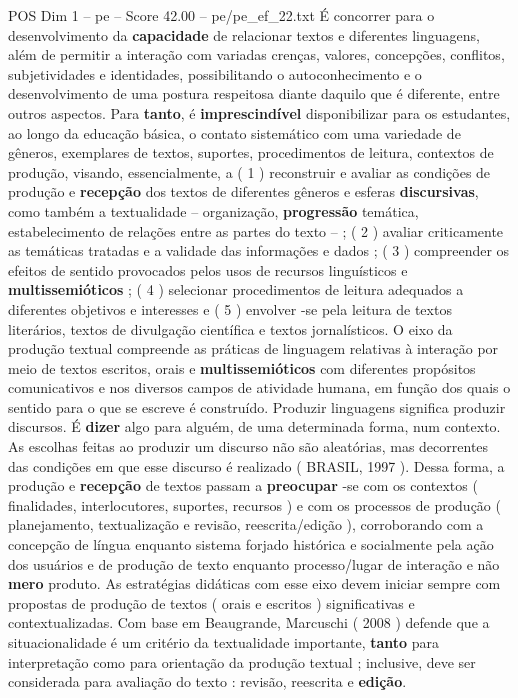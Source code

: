 \begin{textsample}{POS Dim 1 – pe – Score 42.00 – pe/pe\_ef\_22.txt}
É concorrer para o desenvolvimento da \textbf{capacidade} de relacionar textos e diferentes linguagens, além de permitir a interação com variadas crenças, valores, concepções, conflitos, subjetividades e identidades, possibilitando o autoconhecimento e o desenvolvimento de uma postura respeitosa diante daquilo que é diferente, entre outros aspectos.
Para \textbf{tanto}, é \textbf{imprescindível} disponibilizar para os estudantes, ao longo da educação básica, o contato sistemático com uma variedade de gêneros, exemplares de textos, suportes, procedimentos de leitura, contextos de produção, visando, essencialmente, a ( 1 ) reconstruir e avaliar as condições de produção e \textbf{recepção} dos textos de diferentes gêneros e esferas \textbf{discursivas}, como também a textualidade – organização, \textbf{progressão} temática, estabelecimento de relações entre as partes do texto – ; ( 2 ) avaliar criticamente as temáticas tratadas e a validade das informações e dados ; ( 3 ) compreender os efeitos de sentido provocados pelos usos de recursos linguísticos e \textbf{multissemióticos} ; ( 4 ) selecionar procedimentos de leitura adequados a diferentes objetivos e interesses e ( 5 ) envolver -se pela leitura de textos literários, textos de divulgação científica e textos jornalísticos.
O eixo da produção textual compreende as práticas de linguagem relativas à interação por meio de textos escritos, orais e \textbf{multissemióticos} com diferentes propósitos comunicativos e nos diversos campos de atividade humana, em função dos quais o sentido para o que se escreve é construído.
Produzir linguagens significa produzir discursos.
É \textbf{dizer} algo para alguém, de uma determinada forma, num contexto.
As escolhas feitas ao produzir um discurso não são aleatórias, mas decorrentes das condições em que esse discurso é realizado ( BRASIL, 1997 ).
Dessa forma, a produção e \textbf{recepção} de textos passam a \textbf{preocupar} -se com os contextos ( finalidades, interlocutores, suportes, recursos ) e com os processos de produção ( planejamento, textualização e revisão, reescrita/edição ), corroborando com a concepção de língua enquanto sistema forjado histórica e socialmente pela ação dos usuários e de produção de texto enquanto processo/lugar de interação e não \textbf{mero} produto.
As estratégias didáticas com esse eixo devem iniciar sempre com propostas de produção de textos ( orais e escritos ) significativas e contextualizadas.
Com base em Beaugrande, Marcuschi ( 2008 ) defende que a situacionalidade é um critério da textualidade importante, \textbf{tanto} para interpretação como para orientação da produção textual ; inclusive, deve ser considerada para avaliação do texto : revisão, reescrita e \textbf{edição}.

\end{textsample}
